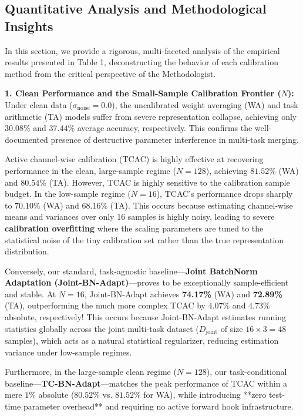 \documentclass{article}
\begin{document}
\subsection{Quantitative Analysis and Methodological Insights}
In this section, we provide a rigorous, multi-faceted analysis of the empirical results presented in Table 1, deconstructing the behavior of each calibration method from the critical perspective of the Methodologist.

\textbf{1. Clean Performance and the Small-Sample Calibration Frontier ($N$):}
Under clean data ($\sigma_{\mathrm{noise}} = 0.0$), the uncalibrated weight averaging (WA) and task arithmetic (TA) models suffer from severe representation collapse, achieving only $30.08\%$ and $37.44\%$ average accuracy, respectively. This confirms the well-documented presence of destructive parameter interference in multi-task merging. 

Active channel-wise calibration (TCAC) is highly effective at recovering performance in the clean, large-sample regime ($N = 128$), achieving $81.52\%$ (WA) and $80.54\%$ (TA). However, TCAC is highly sensitive to the calibration sample budget. In the low-sample regime ($N = 16$), TCAC's performance drops sharply to $70.10\%$ (WA) and $68.16\%$ (TA). This occurs because estimating channel-wise means and variances over only 16 samples is highly noisy, leading to severe \textbf{calibration overfitting} where the scaling parameters are tuned to the statistical noise of the tiny calibration set rather than the true representation distribution.

Conversely, our standard, task-agnostic baseline—\textbf{Joint BatchNorm Adaptation (Joint-BN-Adapt)}—proves to be exceptionally sample-efficient and stable. At $N = 16$, Joint-BN-Adapt achieves \textbf{74.17\%} (WA) and \textbf{72.89\%} (TA), outperforming the much more complex TCAC by $4.07\%$ and $4.73\%$ absolute, respectively! This occurs because Joint-BN-Adapt estimates running statistics globally across the joint multi-task dataset ($D_{\mathrm{joint}}$ of size $16 \times 3 = 48$ samples), which acts as a natural statistical regularizer, reducing estimation variance under low-sample regimes. 

Furthermore, in the large-sample clean regime ($N = 128$), our task-conditional baseline—\textbf{TC-BN-Adapt}—matches the peak performance of TCAC within a mere $1\%$ absolute ($80.52\%$ vs. $81.52\%$ for WA), while introducing **zero test-time parameter overhead** and requiring no active forward hook infrastructure.
\end{document}
